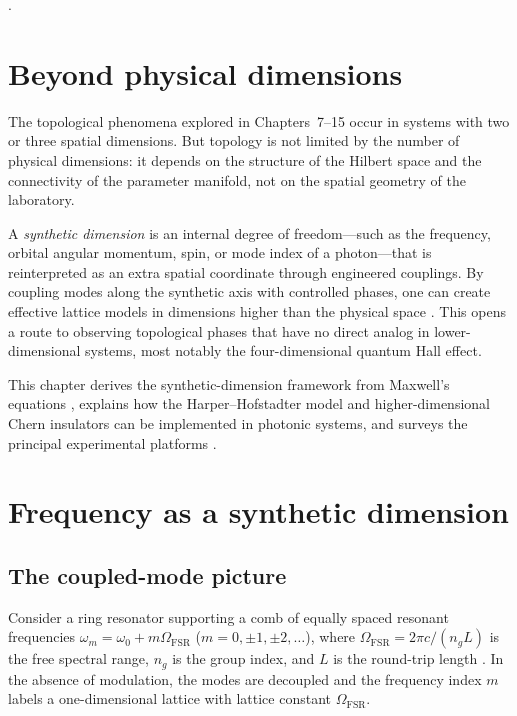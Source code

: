 \cite{kane2005sub}.

\section{Beyond physical dimensions}
\label{sec:ch16-intro}

The topological phenomena explored in Chapters~7--15 occur in systems
with two or three spatial dimensions.  But topology is not limited by
the number of physical dimensions: it depends on the structure of the
Hilbert space and the connectivity of the parameter manifold, not on the
spatial geometry of the laboratory.

A \emph{synthetic dimension} is an internal degree of freedom---such as
the frequency, orbital angular momentum, spin, or mode index of a
photon---that is reinterpreted as an extra spatial coordinate through
engineered couplings.  By coupling modes along the synthetic axis with
controlled phases, one can create effective lattice models in dimensions
higher than the physical space \cite{lin2018constructing}.  This opens a route to observing
topological phases that have no direct analog in lower-dimensional
systems, most notably the four-dimensional quantum Hall effect.

This chapter derives the synthetic-dimension framework from Maxwell's
equations \cite{ozawa2018topological,liu2021observation}, explains how the Harper--Hofstadter model and higher-dimensional
Chern insulators can be implemented in photonic systems, and surveys the
principal experimental platforms \cite{kim2020recent}.

\section{Frequency as a synthetic dimension}
\label{sec:ch16-frequency}

\subsection{The coupled-mode picture}
\label{sec:ch16-coupled-mode}

Consider a ring resonator supporting a comb of equally spaced resonant
frequencies $\omega_m=\omega_0+m\Omega_{\mathrm{FSR}}$
($m=0,\pm 1,\pm 2,\ldots$), where $\Omega_{\mathrm{FSR}}=2\pi c/(n_g L)$
is the free spectral range, $n_g$ is the group index, and $L$ is the
round-trip length
\cite{press2026photonic}.  In the absence of modulation, the modes are
decoupled and the frequency index $m$ labels a one-dimensional lattice
with lattice constant $\Omega_{\mathrm{FSR}}$.

